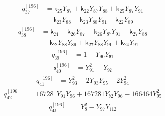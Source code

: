 \begin{equation}\label{q196:row:037}
\begin{aligned}
q_{37}^{[196]} &={} \mathsf{k}_{25}Y_{87} + \mathsf{k}_{22}Y_{87}Y_{88} + \mathsf{k}_{25}Y_{87}Y_{91}\\
&{} - \mathsf{k}_{23}Y_{88} - \mathsf{k}_{23}Y_{88}Y_{91} - \mathsf{k}_{22}Y_{89}
\end{aligned}
\end{equation}
\begin{equation}\label{q196:row:038}
\begin{aligned}
q_{38}^{[196]} &={} \mathsf{k}_{24} - \mathsf{k}_{26}Y_{87} - \mathsf{k}_{26}Y_{87}Y_{91} + \mathsf{k}_{27}Y_{88}\\
&{} - \mathsf{k}_{22}Y_{88}Y_{89} + \mathsf{k}_{27}Y_{88}Y_{91} + \mathsf{k}_{24}Y_{91}
\end{aligned}
\end{equation}
\begin{equation}\label{q196:row:039}
\begin{aligned}
q_{39}^{[196]} &={} 1 - Y_{90}Y_{91}
\end{aligned}
\end{equation}
\begin{equation}\label{q196:row:040}
\begin{aligned}
q_{40}^{[196]} &={} Y_{91}^{2} - Y_{92}
\end{aligned}
\end{equation}
\begin{equation}\label{q196:row:041}
\begin{aligned}
q_{41}^{[196]} &={} Y_{93}^{2} - 2Y_{93}Y_{95} - 2Y_{94}^{2}
\end{aligned}
\end{equation}
\begin{equation}\label{q196:row:042}
\begin{aligned}
q_{42}^{[196]} &={} 167281Y_{91}Y_{96} + 167281Y_{92}Y_{96} - 166464Y_{95}^{2}
\end{aligned}
\end{equation}
\begin{equation}\label{q196:row:043}
\begin{aligned}
q_{43}^{[196]} &={} Y_{8}^{2} - Y_{97}Y_{112}
\end{aligned}
\end{equation}
